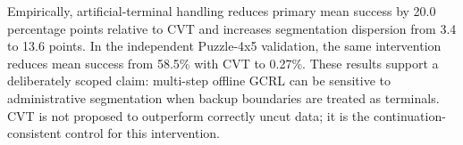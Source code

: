 Empirically, artificial-terminal handling reduces primary mean success by 20.0 percentage points relative to CVT and increases segmentation dispersion from 3.4 to 13.6 points. In the independent Puzzle-4x5 validation, the same intervention reduces mean success from 58.5\% with CVT to 0.27\%. These results support a deliberately scoped claim: multi-step offline GCRL can be sensitive to administrative segmentation when backup boundaries are treated as terminals. CVT is not proposed to outperform correctly uncut data; it is the continuation-consistent control for this intervention.
